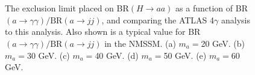 \begin{figure}[htbp]
  \centering 
  \\
  \\
  \caption{The exclusion limit placed on BR$(H\rightarrow aa)$ as a function of BR$(a\rightarrow \gamma\gamma)/\text{BR}(a\rightarrow jj)$, and comparing the ATLAS 4$\gamma$ analysis to this analysis. Also shown is a typical value for BR$(a\rightarrow \gamma\gamma)/\text{BR}(a\rightarrow jj)$ in the NMSSM. (a) $m_a=$20 GeV. (b) $m_a=$30 GeV. (c) $m_a=$40 GeV. (d) $m_a=$50 GeV. (e) $m_a=$60 GeV.}
  \label{fig:HBSM:compare_4gamma}
\end{figure}

